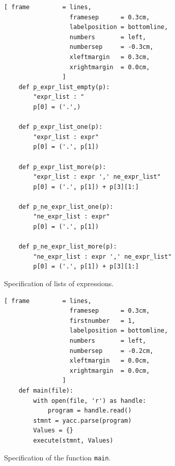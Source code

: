 \begin{figure}[!ht]
\centering
\begin{Verbatim}[ frame         = lines, 
                  framesep      = 0.3cm, 
                  labelposition = bottomline,
                  numbers       = left,
                  numbersep     = -0.3cm,
                  xleftmargin   = 0.3cm,
                  xrightmargin  = 0.0cm,
                ]
    def p_expr_list_empty(p):
        "expr_list : "
        p[0] = ('.',)
        
    def p_expr_list_one(p):
        "expr_list : expr"
        p[0] = ('.', p[1])     
    
    def p_expr_list_more(p):
        "expr_list : expr ',' ne_expr_list"
        p[0] = ('.', p[1]) + p[3][1:]     
    
    def p_ne_expr_list_one(p):
        "ne_expr_list : expr"
        p[0] = ('.', p[1]) 
        
    def p_ne_expr_list_more(p):
        "ne_expr_list : expr ',' ne_expr_list"
        p[0] = ('.', p[1]) + p[3][1:] 
\end{Verbatim}
\vspace*{-0.3cm} %
\caption{Specification of lists of expressions.}
\label{fig:Interpreter-Parser-4}
\end{figure}




\begin{figure}[!ht]
\centering
\begin{Verbatim}[ frame         = lines, 
                  framesep      = 0.3cm, 
                  firstnumber   = 1,
                  labelposition = bottomline,
                  numbers       = left,
                  numbersep     = -0.2cm,
                  xleftmargin   = 0.0cm,
                  xrightmargin  = 0.0cm,
                ]
    def main(file):
        with open(file, 'r') as handle:
            program = handle.read() 
        stmnt = yacc.parse(program)
        Values = {}
        execute(stmnt, Values)
\end{Verbatim}
\vspace*{-0.3cm}
\caption{Specification of the function \texttt{main}.}
\label{fig:Interpreter.ipynb:main}
\end{figure}

